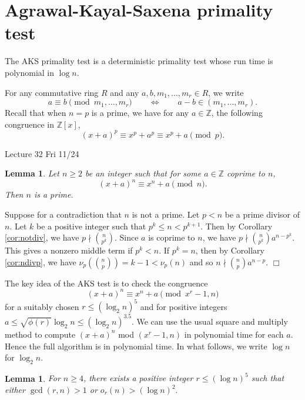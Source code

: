 \documentclass{article}
\def\Z{{\mathbb Z}}
\def\Z{{\mathbb Z}}
\newtheorem{lemma}[subsection]{Lemma}
\newenvironment{proof}{\noindent {\bf Proof:}}{$\Box$ \vspace{2 ex}}
\newcommand{\add}[1]{{\color{blue} #1}}
\begin{document}
\section{Agrawal-Kayal-Saxena primality test}
The AKS primality test is a deterministic primality test whose run time is polynomial in $\log n$. %

For any commutative ring $R$ and any $a,b,m_1,\ldots,m_r\in R$, we write $$a\equiv b\pmod{m_1,\ldots,m_r}\qquad\Longleftrightarrow\qquad a - b \in (m_1,\ldots,m_r).$$ Recall that when $n = p$ is a prime, we have for any $a\in\Z$, the following congruence in $\Z[x]$, $$(x + a)^p\equiv x^p + a^p\equiv x^p + a\pmod{p}.$$
\begin{center}
    \add{Lecture 32 Fri 11/24}
\end{center}
\begin{lemma}\label{lem:np}
    Let $n\geq 2$ be an integer such that for some $a\in\Z$ coprime to $n$,
    $$(x + a)^n \equiv x^n + a\pmod{n}.$$
    Then $n$ is a prime.
\end{lemma}

\begin{proof}
    Suppose for a contradiction that $n$ is not a prime. Let $p<n$ be a prime divisor of $n$. Let $k$ be a positive integer such that $p^k \leq n < p^{k+1}$. Then by Corollary \ref{cor:notdiv}, we have $p\nmid \binom{n}{p^k}$. Since $a$ is coprime to $n$, we have $p\nmid \binom{n}{p^k}a^{n-p^k}$. This gives a nonzero middle term if $p^k < n$. If $p^k = n$, then by Corollary \ref{cor:ndivp}, we have $\nu_p(\binom{n}{p}) = k-1 < \nu_p(n)$ and so $n\nmid \binom{n}{p}a^{n-p}.$
\end{proof}



The key idea of the AKS test is to check the congruence
$$(x + a)^n \equiv x^n + a\pmod{x^r -1, n}$$
for a suitably chosen $r \leq (\log_2 n)^5$ and for positive integers $a\leq \sqrt{\phi(r)}\log_2n \leq (\log_2n)^{3.5}.$ We can use the usual square and multiply method to compute $(x+a)^n$ mod $(x^r - 1,n)$ in polynomial time for each $a$. Hence the full algorithm is in polynomial time. In what follows, we write $\log n$ for $\log_2 n$.

\begin{lemma}
    For $n\geq 4$, there exists a positive integer $r\leq (\log n)^5$ such that either $\gcd(r,n) > 1$ or $o_r(n) > (\log n)^2.$
\end{lemma}
\end{document}
